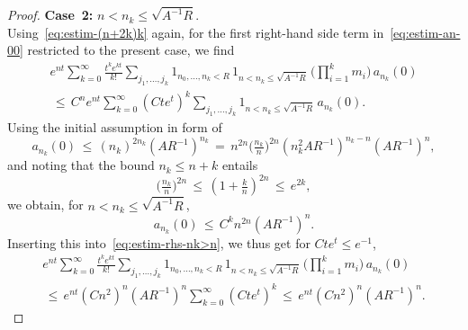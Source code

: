 \documentclass[10pt,a4paper]{amsart}
\begin{document}
\begin{proof}
\noindent
{\bf Case~2:} $n<n_k\le \sqrt{A^{-1}R}$.\\
Using~\eqref{eq:estim-(n+2k)k} again, for the first right-hand side term in~\eqref{eq:estim-an-00} restricted to the present case, we find
\begin{multline}\label{eq:estim-rhs-nk>n}
e^{nt}\sum_{k=0}^\infty \tfrac{t^ke^{kt}}{k!}\sum_{j_1,\ldots,j_k}1_{n_0,\ldots,n_k<R}\,1_{n<n_k\le\sqrt{A^{-1}R}}\,\Big(\prod_{i=1}^km_i\Big)\,a_{n_k}(0)\\
\,\le\,C^ne^{nt}\sum_{k=0}^\infty (Cte^{t})^k\sum_{j_1,\ldots,j_k}1_{n<n_k\le\sqrt{A^{-1}R}}\,a_{n_k}(0).
\end{multline}
Using the initial assumption in form of
\[a_{n_k}(0)\,\le\,(n_k)^{2n_k}(AR^{-1})^{n_k}
\,=\,n^{2n}\big(\tfrac{n_k}{n}\big)^{2n}(n_k^2AR^{-1})^{n_k-n}(AR^{-1})^{n},\]
and noting that the bound $n_k\le n+k$ entails
\[\big(\tfrac{n_k}n\big)^{2n}\,\le\,(1+\tfrac kn)^{2n}\,\le\,e^{2k},\]
we obtain, for $n< n_k\le\sqrt{A^{-1}R}$,
\[a_{n_k}(0)\,\le\,C^kn^{2n}(AR^{-1})^{n}.\]
Inserting this into~\eqref{eq:estim-rhs-nk>n}, we thus get for $Cte^t\le e^{-1}$,
\begin{multline*}
e^{nt}\sum_{k=0}^\infty \tfrac{t^ke^{kt}}{k!}\sum_{j_1,\ldots,j_k}1_{n_0,\ldots,n_k<R}\,1_{n<n_k\le\sqrt{A^{-1}R}}\,\Big(\prod_{i=1}^km_i\Big)\,a_{n_k}(0)\\[-2mm]
\,\le\,e^{nt}(Cn^2)^n(AR^{-1})^n\sum_{k=0}^\infty (Cte^{t})^k\,\le\,e^{nt}(Cn^2)^n(AR^{-1})^n.
\end{multline*}


\end{proof}
\end{document}
